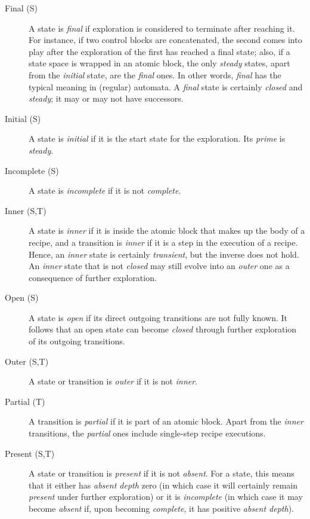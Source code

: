 \documentclass{article}
\begin{document}
\begin{description}
\item[Final (S)] A state is \emph{final} if exploration is considered to terminate after reaching it. For instance, if two control blocks are concatenated, the second comes into play after the exploration of the first has reached a final state; also, if a state space is wrapped in an atomic block, the only \emph{steady} states, apart from the \emph{initial} state, are the \emph{final} ones. In other words, \emph{final} has the typical meaning in (regular) automata. A \emph{final} state is certainly \emph{closed} and \emph{steady}; it may or may not have successors.

\item[Initial (S)] A state is \emph{initial} if it is the start state for the exploration. Its \emph{prime} is \emph{steady}.

\item[Incomplete (S)] A state is \emph{incomplete} if it is not \emph{complete}.

\item[Inner (S,T)] A state is \emph{inner} if it is inside the atomic block that makes up the body of a recipe, and a transition is \emph{inner} if it is a step in the execution of a recipe. Hence, an \emph{inner} state is certainly \emph{transient}, but the inverse does not hold. An \emph{inner} state that is not \emph{closed} may still evolve into an \emph{outer} one as a consequence of further exploration.

\item[Open (S)] A state is \emph{open} if its direct outgoing transitions are not fully known. It follows that an open state can become \emph{closed} through further exploration of its outgoing transitions.

\item[Outer (S,T)] A state or transition is \emph{outer} if it is not \emph{inner}.

\item[Partial (T)] A transition is \emph{partial} if it is part of an atomic block. Apart from the \emph{inner} transitions, the \emph{partial} ones include single-step recipe executions.

\item[Present (S,T)] A state or transition is \emph{present} if it is not \emph{absent}. For a state, this means that it either has \emph{absent depth} zero (in which case it will certainly remain \emph{present} under further exploration) or it is \emph{incomplete} (in which case it may become \emph{absent} if, upon becoming \emph{complete}, it has positive \emph{absent depth}).


\end{description}
\end{document}

